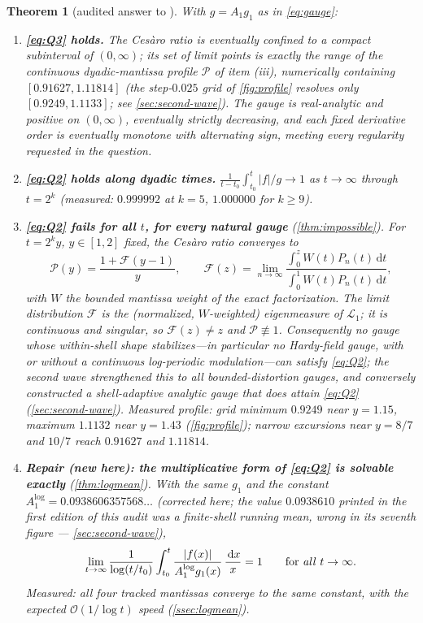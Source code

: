 \documentclass[11pt,oneside]{article}
\newtheorem{theorem}{Theorem}[section]
\theoremstyle{definition}
\theoremstyle{remark}
\newcommand{\dd}{\,\mathrm d}
\newcommand{\bigO}{\mathcal O}
\newcommand{\Lop}{\mathcal L}
\begin{document}
\begin{theorem}[audited answer to \cite{mse-decay}]
\label{thm:audit-answer}
With $g=A_1g_1$ as in \eqref{eq:gauge}:
\begin{enumerate}
\item \textbf{\eqref{eq:Q3} holds.}  The Ces\`aro ratio is eventually
confined to a compact subinterval of $(0,\infty)$; its set of limit points
is exactly the range of the continuous dyadic-mantissa profile
$\mathscr P$ of item (iii), numerically containing
$[0.91627,1.11814]$ (the step-$0.025$ grid of \cref{fig:profile}
resolves only $[0.9249,1.1133]$; see \cref{sec:second-wave}).
The gauge is real-analytic and positive on $(0,\infty)$, eventually
strictly decreasing, and each fixed derivative order is eventually
monotone with alternating sign, meeting every regularity requested in the
question.
\item \textbf{\eqref{eq:Q2} holds along dyadic times.}
$\frac{1}{t-t_0}\int_{t_0}^{t}|f|/g\to1$ as $t\to\infty$ through
$t=2^k$ (measured: $0.999992$ at $k=5$, $1.000000$ for $k\ge9$).
\item \textbf{\eqref{eq:Q2} fails for all $t$, for every natural gauge}
(\cref{thm:impossible}).  For $t=2^ky$, $y\in[1,2]$ fixed, the Ces\`aro
ratio converges to
\[
 \mathscr P(y)=\frac{1+\mathscr F(y-1)}{y},
 \qquad
 \mathscr F(z)
 =\lim_{n\to\infty}
 \frac{\int_0^zW(t)P_n(t)\dd t}{\int_0^1W(t)P_n(t)\dd t},
\]
with $W$ the bounded mantissa weight of the exact factorization.
The limit distribution $\mathscr F$ is the (normalized, $W$-weighted)
eigenmeasure of $\Lop_1$; it is continuous and \emph{singular}, so
$\mathscr F(z)\ne z$ and $\mathscr P\not\equiv1$.  Consequently no gauge
whose within-shell shape stabilizes---in particular no Hardy-field
gauge, with or without a continuous log-periodic
modulation---can satisfy \eqref{eq:Q2}; the second wave strengthened
this to all bounded-distortion gauges, and conversely constructed a
shell-adaptive analytic gauge that does attain \eqref{eq:Q2}
(\cref{sec:second-wave}).  Measured profile:
grid minimum $0.9249$ near $y=1.15$, maximum $1.1132$ near $y=1.43$
(\cref{fig:profile}); narrow excursions near $y=8/7$ and $10/7$ reach
$0.91627$ and $1.11814$.
\item \textbf{Repair (new here): the multiplicative form of \eqref{eq:Q2}
is solvable exactly} (\cref{thm:logmean}).  With the same $g_1$ and the
constant $A_1^{\log}=0.0938606357568\ldots$ (corrected here; the value
$0.0938610$ printed in the first edition of this audit was a
finite-shell running mean, wrong in its seventh figure ---
\cref{sec:second-wave}),
\[
 \lim_{t\to\infty}\frac{1}{\log(t/t_0)}
 \int_{t_0}^{t}\frac{|f(x)|}{A_1^{\log}g_1(x)}\,\frac{\dd x}{x}=1
 \qquad\text{for \emph{all} } t\to\infty.
\]
Measured: all four tracked mantissas converge to the same constant, with
the expected $\bigO(1/\log t)$ speed (\cref{ssec:logmean}).
\end{enumerate}
\end{theorem}
\end{document}
